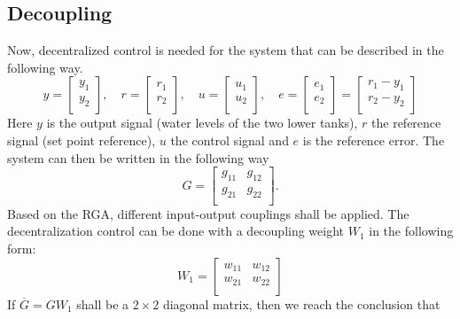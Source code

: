 \documentclass[a4paper,12pt,oneside,onecolumn]{article}
\begin{document}
\subsection{Decoupling}
Now, decentralized control is needed for the system that can be described in the following way.
\begin{equation}
y = \begin{bmatrix} y_1 \\ y_2 \\ \end{bmatrix}, \quad r = \begin{bmatrix} r_1 \\ r_2 \\ \end{bmatrix}, \quad u = \begin{bmatrix} u_1 \\ u_2 \\ \end{bmatrix}, \quad e = \begin{bmatrix} e_1 \\ e_2 \\ \end{bmatrix} = \begin{bmatrix} r_1 - y_1 \\ r_2 - y_2 \\ \end{bmatrix}
\end{equation}
Here $y$ is the output signal (water levels of the two lower tanks), $r$ the reference signal (set point reference), $u$ the control signal and $e$ is the reference error. The system can then be written in the following way
\begin{equation}
    G = \begin{bmatrix}
    g_{11} & g_{12} \\
    g_{21} & g_{22} \\
    \end{bmatrix}.
\end{equation}
Based on the RGA, different input-output couplings shall be applied. The decentralization control can be done with a decoupling weight $W_1$ in the following form:
\begin{equation}
    W_1 = \begin{bmatrix}
    w_{11} & w_{12} \\
    w_{21} & w_{22} \\
    \end{bmatrix}
\end{equation}
If $\overline{G} = G W_1$ shall be a $2\times2$ diagonal matrix, then we reach the conclusion that
\end{document}
